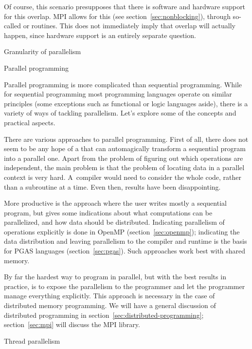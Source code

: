 Of course, this scenario presupposes that there is software and
hardware support for this overlap. MPI allows for this (see
section~\ref{sec:nonblocking}), through so-called
 or  routines. This does not immediately imply that
overlap will actually happen, since hardware support is an entirely
separate question.

 {Granularity of parallelism}



 {Parallel programming}
\label{sec:parallel-programming}

Parallel programming is more complicated than sequential
programming. While for sequential programming most programming
languages operate on similar principles (some exceptions such as
functional or logic languages aside), there is a variety of ways of
tackling parallelism. Let's explore some of the concepts and practical
aspects.

There are various approaches to parallel programming. First of all,
there does not seem to be any hope of a
that can
automagically transform a sequential program into a parallel
one. Apart from the problem of figuring out which operations are
independent, the main
problem is that the problem of locating data in a parallel context is
very hard. A~compiler would need to consider the whole code, rather
than a subroutine at a time. Even then, results have been
disappointing.

More productive is the approach where the user writes mostly a
sequential program, but gives some indications about what computations
can be parallelized, and how data should be distributed. Indicating
parallelism of operations explicitly is done in OpenMP
(section~\ref{sec:openmp}); indicating the data distribution and
leaving parallelism to the compiler and runtime is the basis for PGAS
languages (section~\ref{sec:pgas}). Such approaches work best with
shared memory.

By far the hardest way to program in parallel, but with the best
results in practice, is to expose the parallelism to the programmer
and let the programmer manage everything explicitly. This approach is
necessary in the case of distributed memory programming. We will have
a general discussion of distributed programming in
section~\ref{sec:distributed-programming}; section~\ref{sec:mpi} will
discuss the MPI library.

 {Thread parallelism}
\label{sec:threads}


